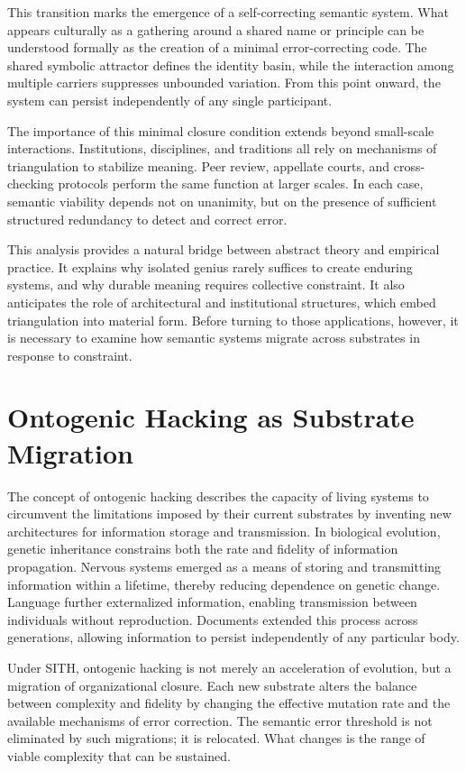 \documentclass[11pt,oneside]{article}
\begin{document}
This transition marks the emergence of a self-correcting semantic system. What appears culturally as a gathering around a shared name or principle can be understood formally as the creation of a minimal error-correcting code. The shared symbolic attractor defines the identity basin, while the interaction among multiple carriers suppresses unbounded variation. From this point onward, the system can persist independently of any single participant.

The importance of this minimal closure condition extends beyond small-scale interactions. Institutions, disciplines, and traditions all rely on mechanisms of triangulation to stabilize meaning. Peer review, appellate courts, and cross-checking protocols perform the same function at larger scales. In each case, semantic viability depends not on unanimity, but on the presence of sufficient structured redundancy to detect and correct error.

This analysis provides a natural bridge between abstract theory and empirical practice. It explains why isolated genius rarely suffices to create enduring systems, and why durable meaning requires collective constraint. It also anticipates the role of architectural and institutional structures, which embed triangulation into material form. Before turning to those applications, however, it is necessary to examine how semantic systems migrate across substrates in response to constraint.

\section{Ontogenic Hacking as Substrate Migration} 

The concept of ontogenic hacking describes the capacity of living systems to circumvent the limitations imposed by their current substrates by inventing new architectures for information storage and transmission. In biological evolution, genetic inheritance constrains both the rate and fidelity of information propagation. Nervous systems emerged as a means of storing and transmitting information within a lifetime, thereby reducing dependence on genetic change. Language further externalized information, enabling transmission between individuals without reproduction. Documents extended this process across generations, allowing information to persist independently of any particular body.

Under SITH, ontogenic hacking is not merely an acceleration of evolution, but a migration of organizational closure. Each new substrate alters the balance between complexity and fidelity by changing the effective mutation rate and the available mechanisms of error correction. The semantic error threshold is not eliminated by such migrations; it is relocated. What changes is the range of viable complexity that can be sustained.
\end{document}
